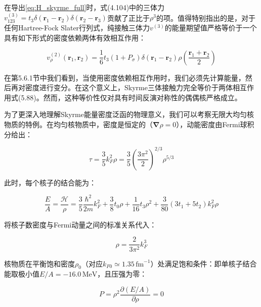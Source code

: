 在导出\ref{eq:H_skyrme_full}时，式(4.104)中的三体力$v^{(3)}_{123}=t_{3}\delta(\boldsymbol{r}_{1}-\boldsymbol{r}_{2})\delta(\boldsymbol{r}_{2}-\boldsymbol{r}_{3})$贡献了正比于$\rho^{3}$的项。值得特别指出的是，对于任何Hartree-Fock
Slater行列式，纯接触三体力$v^{(3)}$的能量期望值严格等价于一个具有如下形式的密度依赖两体有效相互作用：

\begin{equation}
v^{(2)}_{\rho}(\boldsymbol{r}_{1},\boldsymbol{r}_{2})=\frac{1}{6}t_{3}(1+P_{\sigma})\delta(\boldsymbol{r}_{1}-\boldsymbol{r}_{2})\rho\left(\frac{\boldsymbol{r}_{1}+\boldsymbol{r}_{2}}{2}\right)\label{eq:skyrme_density_dep_2body}
\end{equation}

在第5.6.1节中我们看到，当使用密度依赖相互作用时，我们必须先计算能量，然后再对密度进行变分。在这个意义上，Skyrme三体接触力完全等价于两体相互作用式(5.88)。然而，这种等价性仅对具有时间反演对称性的偶偶核严格成立。

为了更深入地理解Skyrme能量密度泛函的物理意义，我们可以考察无限大均匀核物质的特例。在均匀核物质中，密度是恒定的（$\boldsymbol{\nabla}\rho=0$），动能密度由Fermi球积分给出：

\begin{equation}
\tau=\frac{3}{5}k^{2}_{F}\rho=\frac{3}{5}\left(\frac{3\pi^{2}}{2}\right)^{2/3}\rho^{5/3}\label{eq:tau_nuc_matter}
\end{equation}

此时，每个核子的结合能为：

\begin{equation}
\frac{E}{A}=\frac{\mathcal{H}}{\rho}=\frac{3}{5}\frac{\hbar^{2}}{2m}k^{2}_{F}+\frac{3}{8}t_{0}\rho+\frac{1}{16}t_{3}\rho^{2}+\frac{3}{80}\left(3t_{1}+5t_{2}\right)k^{2}_{F}\rho\label{eq:E_over_A_nuc_matter}
\end{equation}

将核子数密度与Fermi动量之间的标准关系代入：

\begin{equation}
\rho=\frac{2}{3\pi^{2}}k^{3}_{F}\label{eq:rho_kf}
\end{equation}

核物质在平衡饱和密度$\rho_{0}$（对应$k_{F0}\simeq1.35\,\mathrm{fm}^{-1}$）处满足饱和条件：即单核子结合能取极小值$E/A=-16.0\,\mathrm{MeV}$，且压强为零：

\begin{equation}
P=\rho^{2}\frac{\partial(E/A)}{\partial\rho}=0\label{eq:saturation_pressure_zero}
\end{equation}

